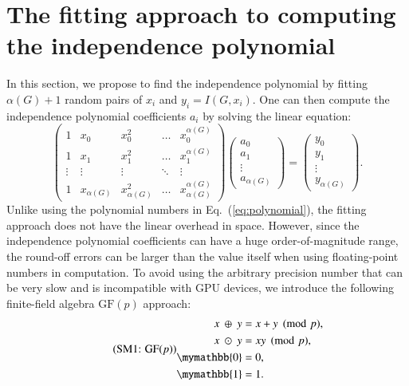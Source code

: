 \documentclass[onefignum, onetabnum]{siamart190516}
\newcommand{\eqname}[1]{\stepcounter{equation}\tag{\theequation : #1}}
\newcommand{\<}{\langle}
\renewcommand{\>}{\rangle}
\newcommand{\Eq}[1]{Eq.~(\ref{#1})}
\begin{document}
\section{The fitting approach to computing the independence polynomial}\label{sec:finitefield}
In this section, we propose to find the independence polynomial by fitting $\alpha(G)+1$ random pairs of $x_{i}$ and $y_{i} = I(G,x_{i})$. One can then compute the independence polynomial coefficients $a_{i}$ by solving the linear equation: 
\begin{equation}
\left(\begin{matrix}
1 & x_0 & x_0^2 & \ldots & x_0^{\alpha(G)} \\
1 & x_1 & x_1^2 & \ldots & x_1^{\alpha(G)} \\
\vdots & \vdots & \vdots &\ddots & \vdots \\
1 & x_{\alpha(G)} & x_{\alpha(G)}^2 & \ldots & x_{\alpha(G)}^{\alpha(G)}
\end{matrix}\right)
\left(\begin{matrix}
a_0 \\ a_1 \\ \vdots \\ a_{\alpha(G)}
\end{matrix}\right)
= \left(\begin{matrix}
y_0 \\ y_1 \\ \vdots \\ y_{\alpha(G)}
\end{matrix}\right).\label{eq:lineareq}
\end{equation}
Unlike using the polynomial numbers in \Eq{eq:polynomial},  the fitting approach does not have the linear overhead in space.
However, since the independence polynomial coefficients can have a huge order-of-magnitude range, the round-off errors can be larger than the value itself when using floating-point numbers in computation.
To avoid using the arbitrary precision number that can be very slow and is incompatible with GPU devices, we introduce the following finite-field algebra $\text{GF}(p)$ approach:
\begin{equation}
\eqname{GF$(p)$}
\begin{split}
    x ~\oplus~ y &= x+y\pmod p,\\
    x ~\odot~ y &= xy\pmod p,\\
    \mymathbb{0} &= 0,\\
    \mymathbb{1} &= 1.
\end{split}\label{eq:finitefield}
\end{equation}
\end{document}
